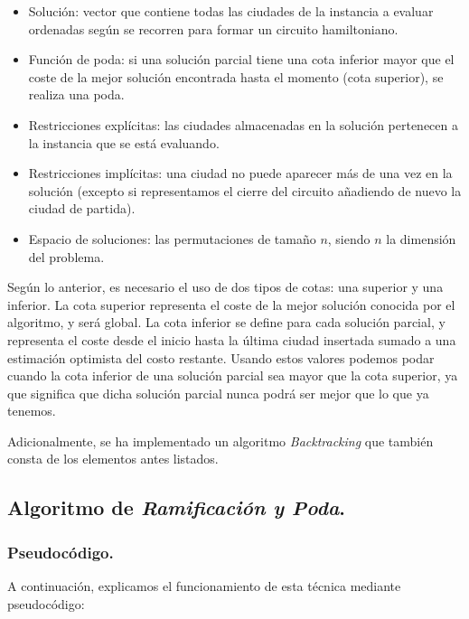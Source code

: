 \documentclass[11pt,a4paper]{article}
\begin{document}
		\begin{itemize}

			\item
			Solución: vector que contiene todas las ciudades de la instancia a evaluar ordenadas según se recorren para formar un circuito hamiltoniano.
			\item
			Función de poda: si una solución parcial tiene una cota inferior mayor que el coste de la mejor solución encontrada hasta el momento (cota superior), se realiza una poda.
			\item
			Restricciones explícitas: las ciudades almacenadas en la solución pertenecen a la instancia que se está evaluando.
			\item
			Restricciones implícitas: una ciudad no puede aparecer más de una vez en la solución (excepto si representamos el cierre del circuito añadiendo de nuevo la ciudad de partida).
			\item
			Espacio de soluciones: las permutaciones de tamaño $n$, siendo $n$ la dimensión del problema.

		\end{itemize}

		\par
		Según lo anterior, es necesario el uso de dos tipos de cotas: una superior y una inferior. La cota superior representa el coste de la mejor solución conocida por el algoritmo, y será global. La cota inferior se define para cada solución parcial, y representa el coste desde el inicio hasta la última ciudad insertada sumado a una estimación optimista del costo restante. Usando estos valores podemos podar cuando la cota inferior de una solución parcial sea mayor que la cota superior, ya que significa que dicha solución parcial nunca podrá ser mejor que lo que ya tenemos.

		\par
		Adicionalmente, se ha implementado un algoritmo \textit{Backtracking} que también consta de los elementos antes listados.

		\subsection{Algoritmo de \textit{Ramificación y Poda}.}

			\subsubsection{Pseudocódigo.}

				\par
				A continuación, explicamos el funcionamiento de esta técnica mediante pseudocódigo:
\end{document}
